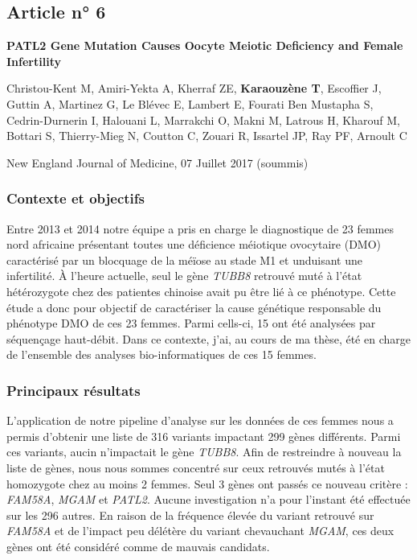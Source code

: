 \documentclass[12pt,twoside]{reedthesis}
\theoremstyle{definition}
\theoremstyle{definition}
\theoremstyle{remark}
\begin{document}
  \subsection{Article n° 6}\label{article-n-6}
  
  \textbf{PATL2 Gene Mutation Causes Oocyte Meiotic Deficiency and Female
  Infertility}
  
  Christou-Kent M, Amiri-Yekta A, Kherraf ZE, \textbf{Karaouzène T},
  Escoffier J, Guttin A, Martinez G, Le Blévec E, Lambert E, Fourati Ben
  Mustapha S, Cedrin-Durnerin I, Halouani L, Marrakchi O, Makni M, Latrous
  H, Kharouf M, Bottari S, Thierry-Mieg N, Coutton C, Zouari R, Issartel
  JP, Ray PF, Arnoult C
  
  New England Journal of Medicine, 07 Juillet 2017 (soummis)
  
  \newpage
  
  \subsubsection{Contexte et objectifs}\label{contexte-et-objectifs-3}
  
  Entre 2013 et 2014 notre équipe a pris en charge le diagnostique de 23
  femmes nord africaine présentant toutes une déficience méiotique
  ovocytaire (DMO) caractérisé par un blocquage de la méïose au stade M1
  et unduisant une infertilité. À l'heure actuelle, seul le gène
  \emph{TUBB8} retrouvé muté à l'état hétérozygote chez des patientes
  chinoise avait pu être lié à ce phénotype. Cette étude a donc pour
  objectif de caractériser la cause génétique responsable du phénotype DMO
  de ces 23 femmes. Parmi cells-ci, 15 ont été analysées par séquençage
  haut-débit. Dans ce contexte, j'ai, au cours de ma thèse, été en charge
  de l'ensemble des analyses bio-informatiques de ces 15 femmes.
  
  \newpage
  
  
  
  \newpage
  
  \subsubsection{Principaux résultats}\label{principaux-resultats-3}
  
  L'application de notre pipeline d'analyse sur les données de ces femmes
  nous a permis d'obtenir une liste de 316 variants impactant 299 gènes
  différents. Parmi ces variants, aucin n'impactait le gène \emph{TUBB8}.
  Afin de restreindre à nouveau la liste de gènes, nous nous sommes
  concentré sur ceux retrouvés mutés à l'état homozygote chez au moins 2
  femmes. Seul 3 gènes ont passés ce nouveau critère : \emph{FAM58A},
  \emph{MGAM} et \emph{PATL2}. Aucune investigation n'a pour l'instant été
  effectuée sur les 296 autres. En raison de la fréquence élevée du
  variant retrouvé sur \emph{FAM58A} et de l'impact peu délétère du
  variant chevauchant \emph{MGAM}, ces deux gènes ont été considéré comme
  de mauvais candidats.
  
\end{document}
